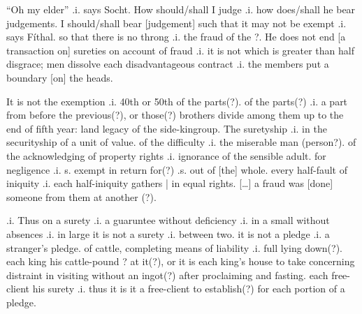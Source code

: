 \documentclass[11pt]{article}
\begin{document}
\begin{pages}
\begin{Rightside}
    \pstart
    \enquote{Oh my elder} .i. says Socht.  How should/shall I judge .i. how does/shall he bear judgements.  I should/shall bear [judgement] such that it may not be exempt .i. says F\'{i}thal. so that there is no throng .i. the fraud of the ?.  He does not end [a transaction on] sureties on account of fraud .i. it is not which is greater than half disgrace; men dissolve each disadvantageous contract .i. the members put a boundary [on] the heads.   
    \pend
    
    \pstart
    It is not the exemption .i. 40th or 50th of the parts(?). of the parts(?) .i. a part from before the previous(?), or those(?) brothers divide among them up to the end of fifth year: land legacy of the side-kingroup. The suretyship .i. in the securityship of a unit of value.  of the difficulty .i. the miserable man (person?). of the acknowledging of property rights .i. ignorance of the sensible adult. for negligence .i. s. exempt in return for(?) .s. out of [the] whole. every half-fault of iniquity .i. each half-iniquity gathers | in equal rights. [\ldots{}]  a fraud was [done] someone from them at another (?). 
    \pend
  
    \pstart
    [\ldots{}?] .i. Thus on a surety .i. a guaruntee without deficiency .i. in a small without absences .i. in large it is not a surety .i. between two.  it is not a pledge .i. a stranger's pledge.  of cattle, completing means of liability .i. full lying down(?).  each king his cattle-pound ? at it(?), or it is each king's house to take concerning distraint in visiting without an ingot(?) after proclaiming and fasting.  each free-client his surety .i. thus it is it a free-client to establish(?) for each portion of a pledge.

    \pend
  \endnumbering
  \end{Rightside}
  \Pages
 

\end{pages}
\end{document}
